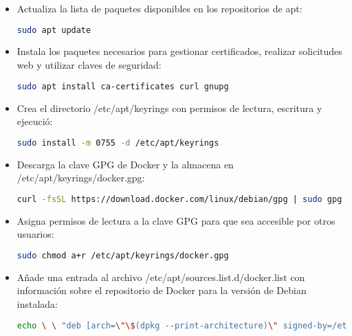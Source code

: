 		
		\begin{itemize}
			\item Actualiza la lista de paquetes disponibles en los repositorios de apt:
			
			\begin{lstlisting}[language=Bash, caption=udpate]
			sudo apt update
			\end{lstlisting}
	
		\item Instala los paquetes necesarios para gestionar certificados, realizar solicitudes web y utilizar claves de seguridad:
			\begin{lstlisting}[language=Bash, caption=install]
			sudo apt install ca-certificates curl gnupg
			\end{lstlisting}
	
		\item Crea el directorio /etc/apt/keyrings con permisos de lectura, escritura y ejecució:
			\begin{lstlisting}[language=Bash, caption=install]
			sudo install -m 0755 -d /etc/apt/keyrings
			\end{lstlisting}
	
		\item Descarga la clave GPG de Docker y la almacena en /etc/apt/keyrings/docker.gpg:
			\begin{lstlisting}[language=Bash, caption=gpg]
			curl -fsSL https://download.docker.com/linux/debian/gpg | sudo gpg --dearmor -o /etc/apt/keyrings/docker.gpg
			\end{lstlisting}
		
		\item Asigna permisos de lectura a la clave GPG para que sea accesible por otros usuarios:
			\begin{lstlisting}[language=Bash, caption=permisos]
			sudo chmod a+r /etc/apt/keyrings/docker.gpg
			\end{lstlisting}
		
		\item Añade una entrada al archivo /etc/apt/sources.list.d/docker.list con información sobre el repositorio de Docker para la versión de Debian instalada:
			
			\begin{lstlisting}[language=Bash, caption=repositorio]
			echo \ \ "deb [arch=\"\$(dpkg --print-architecture)\" signed-by=/etc/apt/keyrings/docker.gpg] https://download.docker.com/linux/debian \ \ \"\$(. /etc/os-release \&\& echo \"\$VERSION_CODENAME\")\" stable" | sudo tee /etc/apt/sources.list.d/docker.list > /dev/null
			\end{lstlisting}
		

\end{itemize}
